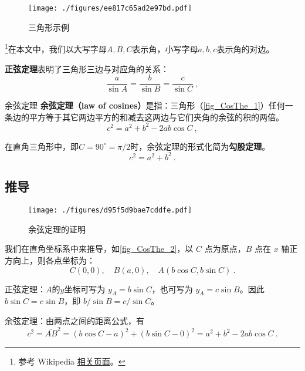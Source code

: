 \begin{figure}[ht]
\centering
\texttt{[image: ./figures/ee817c65ad2e97bd.pdf]}
\caption{三角形示例} \label{fig_CosThe_1}
\end{figure}

\footnote{参考 Wikipedia \href{https://en.wikipedia.org/wiki/Law_of_cosines}{相关页面}。}在本文中，我们以大写字母$A, B, C$表示角，小写字母$a, b, c$表示角的对边。

\textbf{正弦定理}表明了三角形三边与对应角的关系：
\begin{equation}
\frac{a}{\sin A} = \frac{b}{\sin B} = \frac{c}{\sin C} ~,
\end{equation}
\begin{theorem}{余弦定理}
\textbf{余弦定理（law of cosines）}是指：三角形（\autoref{fig_CosThe_1}）任何一条边的平方等于其它两边平方的和减去这两边与它们夹角的余弦的积的两倍。
\begin{equation}\label{eq_CosThe_1}
c^2=a^2 + b^2 - 2ab\cos C~,
\end{equation}
\end{theorem}


在直角三角形中，即$C=90^\circ = \pi / 2$时，余弦定理的形式化简为\textbf{勾股定理}。
\begin{equation}
c^2 = a^2 + b^2~.
\end{equation}

\subsection{推导}
\begin{figure}[ht]
\centering
\texttt{[image: ./figures/d95f5d9bae7cddfe.pdf]}
\caption{余弦定理的证明} \label{fig_CosThe_2}
\end{figure}
我们在直角坐标系中来推导，如\autoref{fig_CosThe_2}，以 $C$ 点为原点，$B$ 点在 $x$ 轴正方向上，则各点坐标为：
\begin{equation}
C(0,0),\quad B(a,0),\quad A(b\cos C,b\sin C)~.
\end{equation}

正弦定理：$A$的$y$坐标可写为 $y_A = b \sin C$，也可写为 $y_A = c \sin B$。因此 $b \sin C = c \sin B$，即 $b/ \sin B = c / \sin C$。

余弦定理：由两点之间的距离公式，有
\begin{equation}
c^2=\overline{AB}^2=(b\cos C-a)^2+(b\sin C-0)^2=a^2+b^2-2ab\cos C~.
\end{equation}

